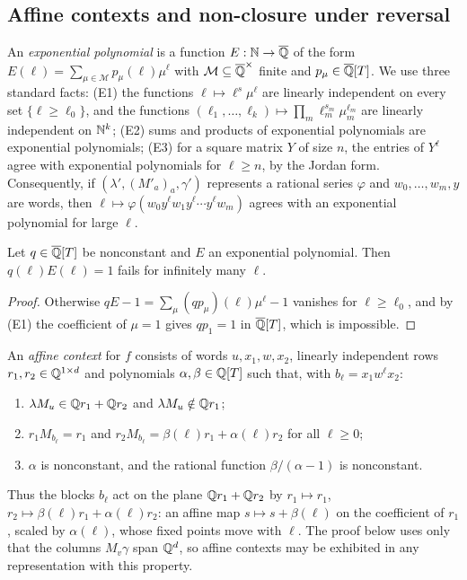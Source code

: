 \subsection{Affine contexts and non-closure under reversal}
An \emph{exponential polynomial} is a function $E:\mathbb{N}\to\overline{\mathbb{Q}}$ of the form $E(\ell)=\sum_{\mu\in\mathcal M}p_\mu(\ell)\mu^\ell$ with $\mathcal M\subseteq\overline{\mathbb{Q}}^\times$ finite and $p_\mu\in\overline{\mathbb{Q}}[T]$. We use three standard facts: (E1) the functions $\ell\mapsto\ell^s\mu^\ell$ are linearly independent on every set $\{\ell\ge\ell_0\}$, and the functions $(\ell_1,\ldots,\ell_k)\mapsto\prod_m\ell_m^{s_m}\mu_m^{\ell_m}$ are linearly independent on $\mathbb{N}^k$; (E2) sums and products of exponential polynomials are exponential polynomials; (E3) for a square matrix $Y$ of size $n$, the entries of $Y^\ell$ agree with exponential polynomials for $\ell\ge n$, by the Jordan form. Consequently, if $(\lambda',(M'_a)_a,\gamma')$ represents a rational series $\varphi$ and $w_0,\ldots,w_m,y$ are words, then $\ell\mapsto\varphi(w_0y^\ell w_1y^\ell\cdots y^\ell w_m)$ agrees with an exponential polynomial for large $\ell$.

\begin{lemma}\label{lem:exppoly}
Let $q\in\overline{\mathbb{Q}}[T]$ be nonconstant and $E$ an exponential polynomial. Then $q(\ell)E(\ell)=1$ fails for infinitely many $\ell$.
\end{lemma}
\begin{proof}
Otherwise $qE-1=\sum_\mu(qp_\mu)(\ell)\mu^\ell-1$ vanishes for $\ell\ge\ell_0$, and by (E1) the coefficient of $\mu=1$ gives $qp_1=1$ in $\overline{\mathbb{Q}}[T]$, which is impossible.
\end{proof}

\begin{definition}\label{def:affinecontext}
An \emph{affine context} for $f$ consists of words $u,x_1,w,x_2$, linearly independent rows $r_1,r_2\in\mathbb{Q}^{1\times d}$ and polynomials $\alpha,\beta\in\mathbb{Q}[T]$ such that, with $b_\ell=x_1w^\ell x_2$:
\begin{enumerate}
\item[(i)] $\lambda M_u\in\mathbb{Q} r_1+\mathbb{Q} r_2$ and $\lambda M_u\notin\mathbb{Q} r_1$;
\item[(ii)] $r_1M_{b_\ell}=r_1$ and $r_2M_{b_\ell}=\beta(\ell)r_1+\alpha(\ell)r_2$ for all $\ell\ge0$;
\item[(iii)] $\alpha$ is nonconstant, and the rational function $\beta/(\alpha-1)$ is nonconstant.
\end{enumerate}
\end{definition}
Thus the blocks $b_\ell$ act on the plane $\mathbb{Q} r_1+\mathbb{Q} r_2$ by $r_1\mapsto r_1$, $r_2\mapsto\beta(\ell)r_1+\alpha(\ell)r_2$: an affine map $s\mapsto s+\beta(\ell)$ on the coefficient of $r_1$, scaled by $\alpha(\ell)$, whose fixed points move with $\ell$. The proof below uses only that the columns $M_v\gamma$ span $\mathbb{Q}^d$, so affine contexts may be exhibited in any representation with this property.

